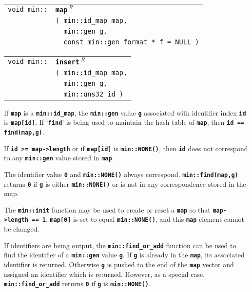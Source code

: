 \documentclass[12pt]{article}
\makeatletter
\newcommand{\TT}[1]{{\tt \bfseries #1}}
\newcommand{\ttindex}[1]{\index{#1@{\tt #1}}}
\newcommand{\EOL}{\penalty \exhyphenpenalty}
\newenvironment{indpar}[1][0.3in]%
	{\begin{list}{}%
		     {\setlength{\itemsep}{0in}%
		      \setlength{\topsep}{0in}%
		      \setlength{\parsep}{1ex}%
		      \setlength{\labelwidth}{#1}%
		      \setlength{\leftmargin}{#1}%
		      \addtolength{\leftmargin}{\labelsep}}%
	 \item}%
	{\end{list}}
\newcommand{\LABEL}[1]{\label{#1}}
\newlength{\ARGBREAKLENGTH}
\newcommand{\ARGBREAK}[1][\ARGBREAKLENGTH]{\\&\hspace*{#1}}
\newcommand{\MINKEY}[1]%
	   {\TT{#1}\ttindex{min::#1}\ttindex{#1}}
\newcommand{\REL}{$\,^R$}
\makeatother
\begin{document}
\begin{indpar}[1em]\begin{tabular}{r@{}l}
\verb|void min::| & \MINKEY{map\REL}\ARGBREAK
    \verb|( min::id_map map,|\ARGBREAK
    \verb|  min::gen g,|\ARGBREAK
    \verb|  const min::gen_format * f = NULL )|
\LABEL{MIN::MAP_OF_ID_MAP} \\
\end{tabular}\end{indpar}

\begin{indpar}[1em]\begin{tabular}{r@{}l}
\verb|void min::| & \MINKEY{insert\REL}\ARGBREAK
    \verb|( min::id_map map,|\ARGBREAK
    \verb|  min::gen g,|\ARGBREAK
    \verb|  min::uns32 id )|
\LABEL{MIN::INSERT_OF_ID_MAP} \\
\end{tabular}\end{indpar}

If \TT{map} is a \TT{min::\EOL id\_\EOL map},
the \TT{min::gen} value \TT{g} associated with identifier index \TT{id} is
\TT{map[id]}.  If `\TT{find}' is being used to maintain the hash
table of \TT{map}, then \TT{id == find(map,g)}.

If \TT{id >= map->length} or if \TT{map[id]} is
\TT{min::NONE()}, then \TT{id} does not correspond
to any \TT{min::gen} value stored in \TT{map}.

The identifier value \TT{0} and \TT{min::NONE()} always correspond.
\TT{min::\EOL find(map,g)} returns \TT{0} if \TT{g} is either
\TT{min::NONE()} or is not in any correspondence stored in the map.

The \TT{min::init} function may be used to create or reset a \TT{map}
so that \TT{map->length == 1}.  \TT{map[0]} is set to equal
\TT{min::NONE()}, and this \TT{map} element cannot
be changed.

If identifiers are being output, the \TT{min::find\_\EOL or\_\EOL add}
function can be used to find the identifier of a \TT{min::gen} value
\TT{g}.  If \TT{g} is already
in the \TT{map}, its associated identifier is returned.  Otherwise \TT{g}
is pushed to the end of the \TT{map} vector and assigned an identifier which
is returned.  However, as a special case,
\TT{min::\EOL find\_\EOL or\_\EOL add} returns
\TT{0} if \TT{g} is \TT{min::NONE()}.
\end{document}

